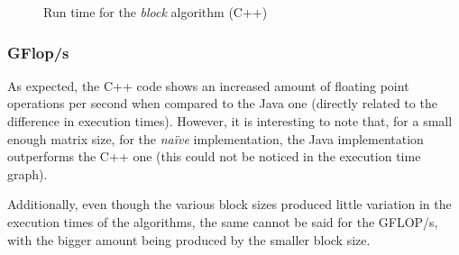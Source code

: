\documentclass[11pt,a4paper]{article}
\begin{document}
\begin{figure}[H]
    \centering
    \caption{Run time for the \emph{block} algorithm (C++)}
\end{figure}

\subsubsection{GFlop/\unit{\second}}

As expected, the C++ code shows an increased amount of floating point operations per second when compared to the Java one (directly related to the difference in execution times). However, it is interesting to note that, for a small enough matrix size, for the \emph{naïve} implementation, the Java implementation outperforms the C++ one (this could not be noticed in the execution time graph).

Additionally, even though the various block sizes produced little variation in the execution times of the algorithms, the same cannot be said for the GFLOP/s, with the bigger amount being produced by the smaller block size.
\end{document}
